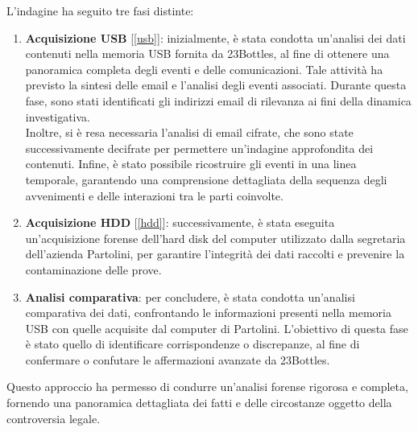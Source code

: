 
L'indagine ha seguito tre fasi distinte:

\begin{enumerate}
    \item \textbf{Acquisizione USB} [\ref{usb}]: inizialmente, è stata condotta un'analisi dei dati contenuti nella memoria USB fornita da 23Bottles, al fine di ottenere una panoramica completa degli eventi e delle comunicazioni. Tale attività ha previsto la sintesi delle email e l'analisi degli eventi associati. Durante questa fase, sono stati identificati gli indirizzi email di rilevanza ai fini della dinamica investigativa.\\Inoltre, si è resa necessaria l'analisi di email cifrate, che sono state successivamente decifrate per permettere un'indagine approfondita dei contenuti. Infine, è stato possibile ricostruire gli eventi in una linea temporale, garantendo una comprensione dettagliata della sequenza degli avvenimenti e delle interazioni tra le parti coinvolte.
    \item \textbf{Acquisizione HDD} [\ref{hdd}]: successivamente, è stata eseguita un'acquisizione forense dell'hard disk del computer utilizzato dalla segretaria dell'azienda Partolini, per garantire l'integrità dei dati raccolti e prevenire la contaminazione delle prove.
    \item \textbf{Analisi comparativa}: per concludere, è stata condotta un'analisi comparativa dei dati, confrontando le informazioni presenti nella memoria USB con quelle acquisite dal computer di Partolini. L'obiettivo di questa fase è stato quello di identificare corrispondenze o discrepanze, al fine di confermare o confutare le affermazioni avanzate da 23Bottles.
\end{enumerate}
Questo approccio ha permesso di condurre un'analisi forense rigorosa e completa, fornendo una panoramica dettagliata dei fatti e delle circostanze oggetto della controversia legale.
